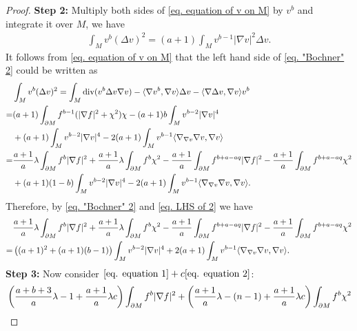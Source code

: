 \documentclass[12pt]{amsart}
\numberwithin{equation}{section}
\numberwithin{lemma}{section}
\numberwithin{proposition}{section}
\numberwithin{corollary}{section}
\numberwithin{remark}{section}
\begin{document}
\begin{proof}
    \textbf{Step 2:} Multiply both sides of \cref{eq. equation of v on M} by $v^b$ and integrate it over $M$, we  have
    \begin{align}\label{eq. "Bochner" 2}
        \int_{M}v^b(\Delta v)^2=(a+1)\int_M v^{b-1}|\nabla v|^2\Delta v.
    \end{align}
    It follows from \cref{eq. equation of v on M} that the left hand side of \cref{eq. "Bochner" 2} could be written as
    \begin{align}\label{eq. LHS of 2}
        &\int_{M}v^b(\Delta v)^2
        =\int_M \mathrm{div}(v^b\Delta v\nabla v)
        -\langle \nabla v^b,\nabla v\rangle\Delta v
        -\langle\nabla \Delta v,\nabla v\rangle v^b\notag\\
        =&(a+1)\int_{\partial M}f^{b-1}(|\nabla f|^2+\chi^2)\chi
        -(a+1)b\int_Mv^{b-2}|\nabla v|^4\notag\\
       & +(a+1)\int_M v^{b-2}|\nabla v|^4
        -2(a+1)\int_M v^{b-1}\langle\nabla_{\nabla v}\nabla v,\nabla v\rangle\notag\\
        =&\frac{a+1}{a}\lambda\int_{\partial M}f^b|\nabla f|^2
        +\frac{a+1}{a}\lambda\int_{\partial M}f^b\chi^2
        -\frac{a+1}{a}\int_{\partial M}f^{b+a-aq}|\nabla f|^2
        -\frac{a+1}{a}\int_{\partial M}f^{b+a-aq}\chi^2\notag\\
        &+(a+1)(1-b)\int_M v^{b-2}|\nabla v|^4
        -2(a+1)\int_M v^{b-1}\langle\nabla_{\nabla v}\nabla v,\nabla v\rangle.
    \end{align}
    Therefore, by \cref{eq. "Bochner" 2} and \cref{eq. LHS of 2} we have
    \begin{align}\label{eq. equation 2}
        &\frac{a+1}{a}\lambda\int_{\partial M}f^b|\nabla f|^2
        +\frac{a+1}{a}\lambda\int_{\partial M}f^b\chi^2
        -\frac{a+1}{a}\int_{\partial M}f^{b+a-aq}|\nabla f|^2
        -\frac{a+1}{a}\int_{\partial M}f^{b+a-aq}\chi^2\notag\\
        =&\left(
        (a+1)^2+(a+1)(b-1)
        \right)\int_M v^{b-2}|\nabla v|^4
        +2(a+1)\int_M v^{b-1}\langle\nabla_{\nabla v}\nabla v,\nabla v\rangle.
    \end{align}
    \textbf{Step 3:} Now consider $\cref{eq. equation 1}+c\cref{eq. equation 2}$:
    \begin{align*}
        &\left(\frac{a+b+3}{a}\lambda-1+\frac{a+1}{a}\lambda c\right)
        \int_{\partial M}f^b|\nabla f|^2
        +\left(\frac{a+1}{a}\lambda-(n-1)+\frac{a+1}{a}\lambda c\right)
        \int_{\partial M}f^b\chi^2\notag\\

\end{align*}
\end{proof}
\end{document}
